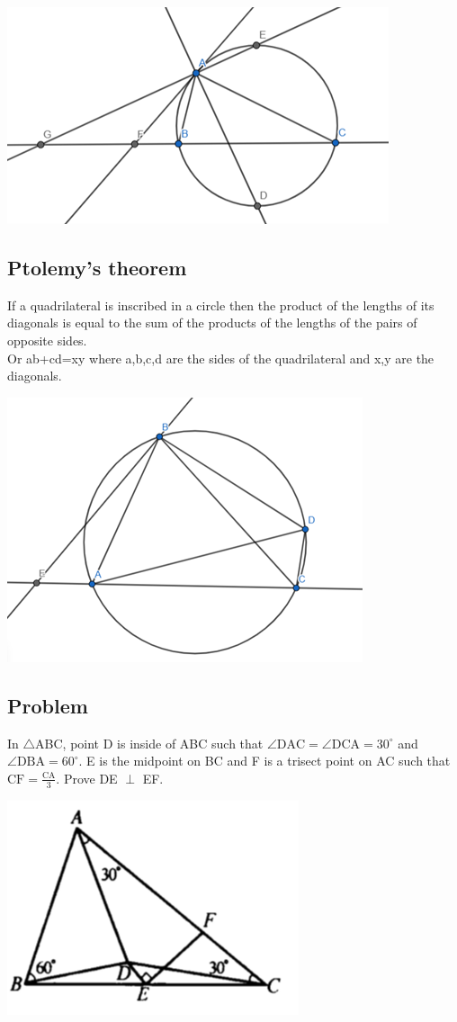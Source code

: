 \documentclass{article}
\begin{document}
\includegraphics{Picture19.png}

\pagebreak

\subsection{Ptolemy's theorem}

If a quadrilateral is inscribed in a circle then the product of the lengths of its diagonals is equal to the sum of the products of the lengths of the pairs of opposite sides.
\\Or ab+cd=xy where a,b,c,d are the sides of the quadrilateral and x,y are the diagonals.

\includegraphics{Picture20.png}

\pagebreak

\subsection{Problem}
In \(\triangle\)ABC, point D is inside of ABC such that \(\angle \mathrm{DAC} = \angle \mathrm{DCA}=30^{\circ} \) and \(\angle \mathrm{DBA}=60^{\circ}\). E is the midpoint on BC and F is a trisect point on AC such that \(\mathrm{CF} = \frac{\mathrm{CA}}{3} \). Prove DE \(\perp\) EF.

\includegraphics{Picture21.png}
\end{document}
